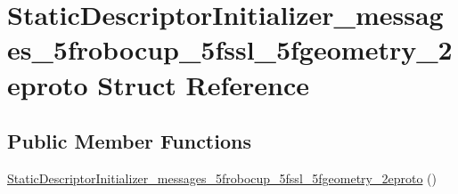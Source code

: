 \hypertarget{struct_static_descriptor_initializer__messages__5frobocup__5fssl__5fgeometry__2eproto}{\section{Static\-Descriptor\-Initializer\-\_\-messages\-\_\-5frobocup\-\_\-5fssl\-\_\-5fgeometry\-\_\-2eproto Struct Reference}
\label{struct_static_descriptor_initializer__messages__5frobocup__5fssl__5fgeometry__2eproto}
}
\subsection*{Public Member Functions}
\begin{DoxyCompactItemize}
\item 
\hyperlink{struct_static_descriptor_initializer__messages__5frobocup__5fssl__5fgeometry__2eproto_a3a2287d0cbfed58d9e36878b1158d014}{Static\-Descriptor\-Initializer\-\_\-messages\-\_\-5frobocup\-\_\-5fssl\-\_\-5fgeometry\-\_\-2eproto} ()
\end{DoxyCompactItemize}


